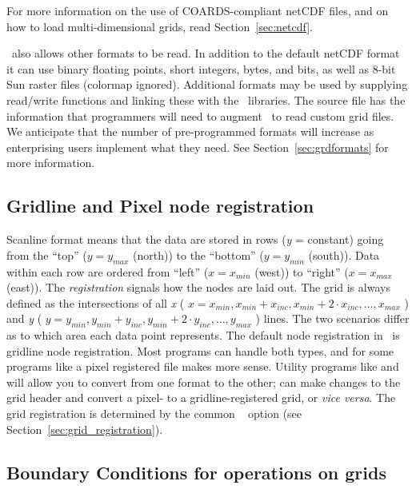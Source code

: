 For more information on the use of COARDS-compliant netCDF files, and on how to load
multi-dimensional grids, read Section~\ref{sec:netcdf}.

\GMT\ also allows other formats to be read.  In addition to
the default netCDF format it can use binary floating points, short
integers, bytes, and bits, as well as 8-bit Sun raster files (colormap
ignored).   Additional formats may be used by supplying read/write
functions and linking these with the \GMT\ libraries.
The source file  has the information that
programmers will need to augment \GMT\ to read custom grid files.  We
anticipate that the number of pre-programmed formats will increase as
enterprising users implement what they need.  See Section~\ref{sec:grdformats}
for more information.


\subsection{Gridline and Pixel node registration}

Scanline format means that the data are stored in rows (\emph{y} = constant)
going from the ``top'' ($y = y_{max}$ (north)) to the ``bottom''
($y = y_{min}$ (south)).  Data within each row are ordered from
``left'' ($x = x_{min}$ (west)) to ``right'' ($x = x_{max}$
(east)).  The \emph{registration} signals how the nodes are laid out.
The grid is always defined as the intersections of all \emph{x}
( \( x = x_{min}, x_{min} + x_{inc}, x_{min} + 2 \cdot x_{inc}, \ldots, x_{max} \) )
and \emph{y} ( \( y = y_{min}, y_{min} + y_{inc}, y_{min} + 2 \cdot y_{inc}, \ldots, y_{max} \) )
lines.  The two scenarios differ as to which area each data point represents.
The default node registration in \GMT\ is gridline node registration.  Most
programs can handle both types, and for some programs like 
a pixel registered file makes more sense.  Utility programs like
 and  will allow you to convert
from one format to the other;  can make changes to the grid header
and convert a pixel- to a gridline-registered grid, or \emph{vice versa}.
The grid registration is determined by the common \GMT\  option
(see Section~\ref{sec:grid_registration}).

\subsection{Boundary Conditions for operations on grids}

